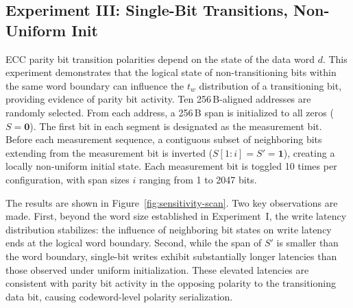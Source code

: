 \subsection{Experiment III: Single-Bit Transitions, Non-Uniform Init}
\label{sec:brewrc-exp3} ECC parity bit transition polarities depend on
the state of the data word $d$. This experiment demonstrates that the
logical state of non-transitioning bits within the same word boundary
can influence the $t_w$ distribution of a transitioning bit, providing
evidence of parity bit activity. Ten 256\,B-aligned addresses are
randomly selected. From each address, a 256\,B span is initialized to
all zeros ($S=\mathbf{0}$). The first bit in each segment is designated
as the measurement bit. Before each measurement sequence, a contiguous
subset of neighboring bits extending from the measurement bit is
inverted ($S[1:i]=S'=\mathbf{1}$), creating a locally non-uniform
initial state. Each measurement bit is toggled 10 times per
configuration, with span sizes $i$ ranging from 1 to 2047 bits.

The results are shown in Figure~\ref{fig:sensitivity-scan}. Two key
observations are made. First, beyond the word size established in
Experiment~I, the write latency distribution stabilizes: the influence
of neighboring bit states on write latency ends at the logical word
boundary. Second, while the span of $S'$ is smaller than the word
boundary, single-bit writes exhibit substantially longer latencies than
those observed under uniform initialization. These elevated latencies
are consistent with parity bit activity in the opposing polarity to the
transitioning data bit, causing codeword-level polarity serialization.

